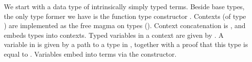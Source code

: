 
We start with a data type  of intrinsically simply typed
terms.
Beside base types, the only type former we have is the function type constructor
.
Contexts (of type ) are implemented as the free magma on types
().
Context concatenation is , and 
embeds types into contexts.
Typed variables in a context are given by .
A variable in
\AgdaBound{$\Gamma$}\AgdaSpace{}\AgdaRecord{$\ni$}\AgdaSpace{}
is given by a path  to a type in \AgdaBound{$\Gamma$}, together
with a proof  that this type is equal to .
Variables embed into terms via the  constructor.

\Var{}
\Term{}
